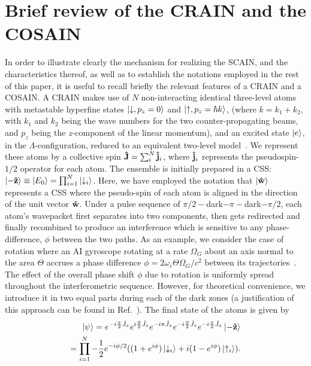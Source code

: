 \documentclass[aps,pra,letterpaper,superscriptaddress,showpacs,amsmath,floats,twocolumn]{revtex4-1}
\begin{document}
\section{Brief review of the CRAIN and the COSAIN}
\label{CRAIN_COSAIN}
In order to illustrate clearly the mechanism for realizing the SCAIN, and the characteristics thereof, as well as to establish the notations employed in the rest of this paper, it is useful to recall briefly the relevant features of a CRAIN and a COSAIN. A CRAIN makes use of $N$ non-interacting identical three-level atoms with metastable hyperfine states $\ket{\downarrow, p_z =0}$ and $\ket{\uparrow, p_z =\hbar k}$, (where $k = k_1 + k_2$, with $k_1$ and $k_2$ being the wave numbers for the two counter-propagating beams, and $p_z$ being the $z$-component of the linear momentum), and an excited state $\ket{e}$, in the $\Lambda$-configuration, reduced to an equivalent two-level model~\cite{Shahriar}. We represent these atoms by a collective spin $\vu{J} = \sum_i^N\vu{j}_i$, where $\vu{j}_i$ represents the pseudospin-$1/2$ operator for each atom. The ensemble is initially prepared in a CSS: $\ket{-\vu{z}}\equiv\ket{E_0} = \prod_{i=1}^N\ket{\downarrow_i}$. Here, we have employed the notation that $\ket{\vu{w}}$ represents a CSS where the pseudo-spin of each atom is aligned in the direction of the unit vector $\vu{w}$. Under a pulse sequence of $\pi/2-$dark$-\pi-$dark$-\pi/2$, each atom's wavepacket first separates into two components, then gets redirected and finally recombined to produce an interference which is sensitive to any phase-difference, $\phi$ between the two paths. As an example, we consider the case of rotation where an AI gyroscope rotating at a rate $\Omega_G$ about an axis normal to the area $\Theta$ accrues a phase difference $\phi= 2\omega_c\Theta\Omega_G/c^2$ between its trajectories~\cite{Sagnac}. The effect of the overall phase shift $\phi$ due to rotation is uniformly spread throughout the interferometric sequence. However, for theoretical convenience, we introduce it in two equal parts during each of the dark zones (a justification of this approach can be found in Ref.~\cite{Shahriar2}). The final state of the atoms is given by
\begin{align}
\ket{\psi} = e^{-i\frac{\pi}{2}\hat{J}_x}e^{i\frac{\phi}{2}\hat{J}_z}e^{-i\pi\hat{J}_x}e^{-i\frac{\phi}{2}\hat{J}_z}e^{-i\frac{\pi}{2}\hat{J}_x}\ket{-\vu{z}}\nonumber\\
= \prod_{i=1}^N-\frac{1}{2}e^{-i\phi/2}((1+e^{i\phi})\ket{\downarrow_i}+i(1-e^{i\phi})\ket{\uparrow_i}).
\end{align}
%
\end{document}
